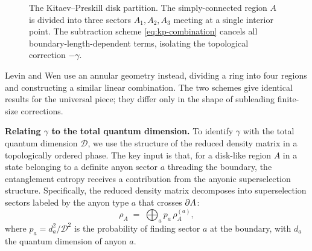 \begin{figure}[ht]
\centering
{}
\caption{The Kitaev--Preskill disk partition.  The simply-connected region $A$ is divided into three sectors $A_1, A_2, A_3$ meeting at a single interior point.  The subtraction scheme \eqref{eq:kp-combination} cancels all boundary-length-dependent terms, isolating the topological correction $-\gamma$.}
\label{fig:kp-geometry}
\end{figure}

\begin{remark}\label{rmk:levin-wen}
Levin and Wen \cite{LevinWen2006DetectingTO} use an annular geometry instead, dividing a ring into four regions and constructing a similar linear combination.  The two schemes give identical results for the universal piece; they differ only in the shape of subleading finite-size corrections.
\end{remark}

\medskip
\noindent\textbf{Relating $\gamma$ to the total quantum dimension.}
To identify $\gamma$ with the total quantum dimension $\mathcal{D}$, we use the structure of the reduced density matrix in a topologically ordered phase.  The key input is that, for a disk-like region $A$ in a state belonging to a definite anyon sector $a$ threading the boundary, the entanglement entropy receives a contribution from the anyonic superselection structure.  Specifically, the reduced density matrix decomposes into superselection sectors labeled by the anyon type $a$ that crosses $\partial A$:
\begin{equation}\label{eq:superselection-decomp}
    \rho_A \;=\; \bigoplus_a p_a \,\rho_A^{(a)},
\end{equation}
where $p_a = d_a^2 / \mathcal{D}^2$ is the probability of finding sector $a$ at the boundary, with $d_a$ the quantum dimension of anyon $a$.

